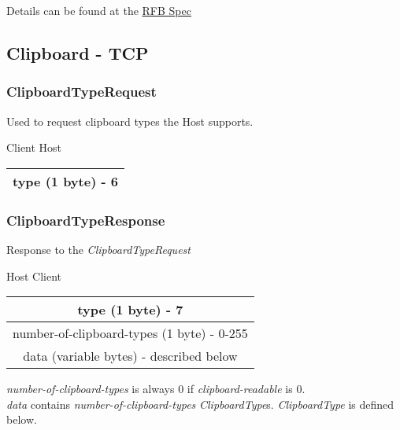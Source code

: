 \documentclass{article}
\begin{document}
    Details can be found at the \href{https://github.com/rfbproto/rfbproto/blob/master/rfbproto.rst#keyevent}{RFB Spec}

    \subsection{Clipboard - TCP} %

    \subsubsection{ClipboardTypeRequest}

    Used to request clipboard types the Host supports.

    \begin{center}
        Client \textrightarrow Host\\
        \begin{tabular}{|c|}
            \hline
            type (1 byte) - 6 \\
            \hline
        \end{tabular}
    \end{center}

    \subsubsection{ClipboardTypeResponse}

    Response to the \emph{ClipboardTypeRequest}

    \begin{center}
        Host \textrightarrow Client\\
        \begin{tabular}{|c|}
            \hline
            type (1 byte) - 7 \\
            \hline
            number-of-clipboard-types (1 byte) - 0-255 \\
            \hline
            data (variable bytes) - described below \\
            \hline
        \end{tabular}
    \end{center}

    \emph{number-of-clipboard-types} is always 0 if \emph{clipboard-readable} is 0.\\

    \emph{data} contains \emph{number-of-clipboard-types} \emph{ClipboardType}s. \emph{ClipboardType} is defined below.
\end{document}
